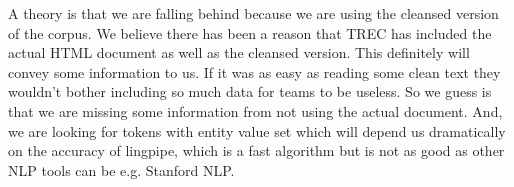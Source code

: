 A theory is that we are falling behind because we are using the cleansed 
version of the corpus. We believe there has been a reason that TREC has 
included the actual HTML document as well as the cleansed version. This 
definitely will convey some information to us. If it was as easy as reading 
some clean text they wouldn't bother including so much data for teams to be 
useless. So we guess is that we are missing some information from not using 
the actual document. And, we are looking for tokens with entity value set 
which will depend us dramatically on the accuracy of lingpipe, which is a fast 
algorithm but is not as good as other NLP tools can be e.g. Stanford NLP.



